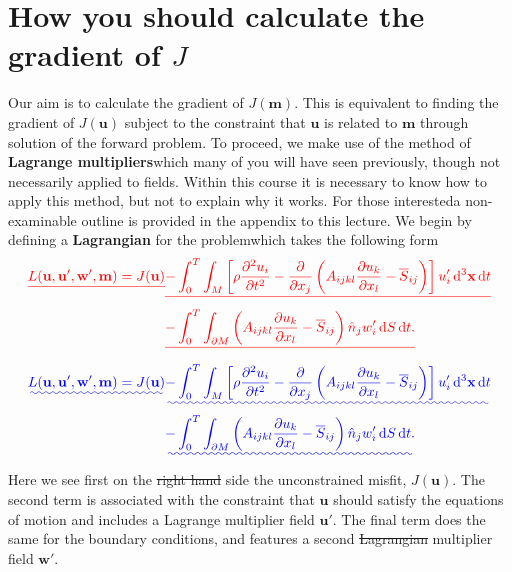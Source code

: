 \documentclass[a4paper,12pt]{paper}
\providecommand{\DIFadd}[1]{{\protect\color{blue}\uwave{#1}}} %
\providecommand{\DIFdel}[1]{{\protect\color{red}\sout{#1}}}                      %
\providecommand{\DIFaddbegin}{} %
\providecommand{\DIFaddend}{} %
\providecommand{\DIFdelbegin}{} %
\providecommand{\DIFdelend}{} %
\begin{document}
\section*{How you should calculate the gradient of $J$}
Our aim is to calculate the gradient of $J(\mathbf{m})$. This is equivalent to finding the gradient 
of $J(\mathbf{u})$ subject to the constraint that $\mathbf{u}$ is related to $\mathbf{m}$ through solution 
of the forward problem. To proceed, we make use of the method of \textbf{Lagrange multipliers}\DIFaddbegin \DIFadd{, }\DIFaddend which many 
of you will have seen previously, though not necessarily applied to fields. Within this course it is necessary 
to know how to apply this method, but not to explain why it works. For those interested\DIFaddbegin \DIFadd{, }\DIFaddend a non-examinable 
outline is provided in the appendix to this lecture. We begin by defining a \textbf{Lagrangian} for the problem\DIFaddbegin \DIFadd{, }\DIFaddend which takes the following form
\DIFdelbegin \begin{align*}
\DIFdel{L(\mathbf{u},\mathbf{u}',\mathbf{w}',\mathbf{m}) = J(\mathbf{u}) }&\DIFdel{- \int_{0}^{T}\int_{M}\left[\rho\frac{\partial^{2}u_{i}}{\partial t^{2}}-\frac{\partial}{\partial x_{j}}\left(A_{ijkl}\frac{\partial u_{k}}{\partial x_{l}}-\overline{S}_{ij}\right)\right]u_{i}'\dd^{3}\mathbf{x}\dd t \nonumber }\\
&\DIFdel{- \int_{0}^{T}\int_{\partial M}\left(A_{ijkl}\frac{\partial u_{k}}{\partial x_{l}}-\overline{S}_{ij}\right)\hat{n}_{j}w_{i}'\dd S\dd t.
}\end{align*}%
\DIFdelend \DIFaddbegin \begin{align}
\DIFadd{L(\mathbf{u},\mathbf{u}',\mathbf{w}',\mathbf{m}) = J(\mathbf{u}) }&\DIFadd{- \int_{0}^{T}\int_{M}\left[\rho\frac{\partial^{2}u_{i}}{\partial t^{2}}-\frac{\partial}{\partial x_{j}}\left(A_{ijkl}\frac{\partial u_{k}}{\partial x_{l}}-\overline{S}_{ij}\right)\right]u_{i}'\dd^{3}\mathbf{x}\dd t \nonumber }\\
&\DIFadd{- \int_{0}^{T}\int_{\partial M}\left(A_{ijkl}\frac{\partial u_{k}}{\partial x_{l}}-\overline{S}_{ij}\right)\hat{n}_{j}w_{i}'\dd S\dd t.
\label{eq:9}
}\end{align}\DIFaddend 
Here we see first on the \DIFdelbegin \DIFdel{right hand }\DIFdelend \DIFaddbegin \DIFadd{right-hand }\DIFaddend side the unconstrained misfit, $J(\mathbf{u})$. The second term is associated with 
the constraint that $\mathbf{u}$ should satisfy the equations of motion and includes a 
Lagrange multiplier field $\mathbf{u}'$. The final term does the same for the boundary conditions, and 
features a second \DIFdelbegin \DIFdel{Lagrangian }\DIFdelend \DIFaddbegin \DIFadd{Lagrange }\DIFaddend multiplier field $\mathbf{w}'$. 
\end{document}
